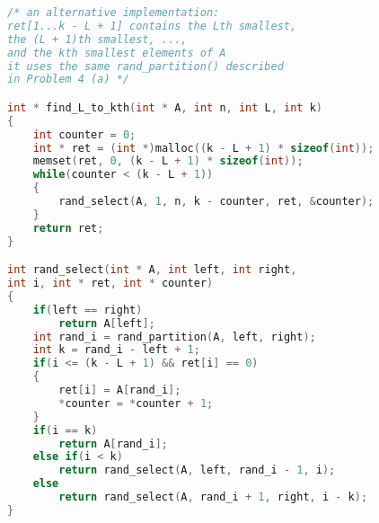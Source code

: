 \documentclass[12pt,border=4pt,multi]{article}%
\begin{document}
\newpage
\noindent
\begin{lstlisting}[language = c, mathescape = true]
/* an alternative implementation:
ret[1...k - L + 1] contains the Lth smallest,
the (L + 1)th smallest, ..., 
and the kth smallest elements of A 
it uses the same rand_partition() described 
in Problem 4 (a) */

int * find_L_to_kth(int * A, int n, int L, int k)
{
    int counter = 0;
    int * ret = (int *)malloc((k - L + 1) * sizeof(int));
    memset(ret, 0, (k - L + 1) * sizeof(int));
    while(counter < (k - L + 1))
    {
        rand_select(A, 1, n, k - counter, ret, &counter);
    }
    return ret;
}

int rand_select(int * A, int left, int right,
int i, int * ret, int * counter)
{
    if(left == right)
        return A[left];
    int rand_i = rand_partition(A, left, right);
    int k = rand_i - left + 1;
    if(i <= (k - L + 1) && ret[i] == 0)
    {
        ret[i] = A[rand_i];
        *counter = *counter + 1;
    }
    if(i == k)
        return A[rand_i];
    else if(i < k)
        return rand_select(A, left, rand_i - 1, i);
    else
        return rand_select(A, rand_i + 1, right, i - k);
}
\end{lstlisting}
\end{document}
